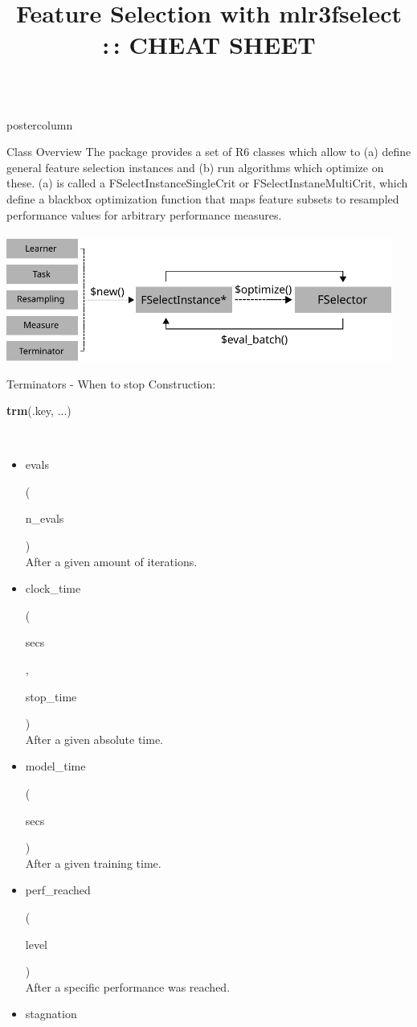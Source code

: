 \documentclass{beamer}
\title{Feature Selection with mlr3fselect :\,: CHEAT SHEET} %
\newlength{\columnheight} %
\newcommand{\codeinline}[1]{\begin{codeboxinline}#1\end{codeboxinline}}
\begin{document}
\begin{frame}[fragile]{}
	\begin{columns}
		\begin{column}{.245\textwidth}
			\begin{beamercolorbox}[center]{postercolumn}
				\begin{minipage}{.98\textwidth}
					\parbox[t][\columnheight]{\textwidth}{
						\begin{myblock}{Class Overview}
							The package provides a set of R6 classes which allow to (a) define general
							feature selection instances and (b) run algorithms which optimize on these.
							(a) is called a FSelectInstanceSingleCrit or FSelectInstaneMultiCrit, which define a blackbox optimization function that maps feature subsets to resampled performance values for arbitrary performance measures.\\
							\\
							\includegraphics[width=0.95\textwidth]{img/class_diagram.pdf}
						\end{myblock}
						\begin{myblock}{Terminators - When to stop}
						Construction: \codeinline{\textbf{trm}(.key, ...)}
						\\
						\begin{itemize}
							\item \codeinline{evals}
							(\codeinline{n\_evals})\\
							After a given amount of iterations.
							\item \codeinline{clock\_time}
							(\codeinline{secs}, \codeinline{stop\_time})\\
							After a given absolute time.
							\item \codeinline{model\_time}
							(\codeinline{secs })\\
							After a given training time.
							\item \codeinline{perf\_reached}
							(\codeinline{level})\\
							After a specific performance was reached.
							\item \codeinline{stagnation}

\end{itemize}
\end{myblock}}
\end{minipage}
\end{beamercolorbox}
\end{column}
\end{columns}
\end{frame}
\end{document}
